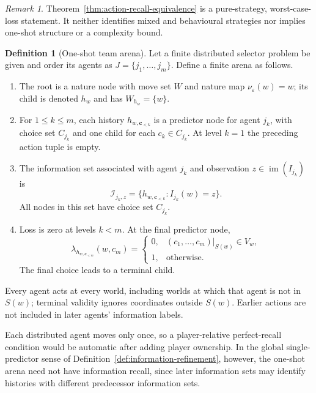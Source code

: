 \documentclass[11pt]{article}
\theoremstyle{plain}
\theoremstyle{definition}
\newtheorem{definition}[theorem]{Definition}
\theoremstyle{remark}
\newtheorem{remark}[theorem]{Remark}
\newcommand{\im}{\operatorname{im}}
\begin{document}
\begin{remark}
Theorem~\ref{thm:action-recall-equivalence} is a pure-strategy, worst-case-loss
statement. It neither identifies mixed and behavioural strategies nor implies
one-shot structure or a complexity bound.
\end{remark}



\begin{definition}[One-shot team arena]\label{def:oneshot}
Let a finite distributed selector problem be given and order its agents as
$J=\{j_1,\ldots,j_m\}$. Define a finite arena as follows.
\begin{enumerate}[label=(\roman*)]
\item The root is a nature node with move set $W$ and nature map
$\nu_\varepsilon(w)=w$; its child is denoted $h_w$ and has
$W_{h_w}=\{w\}$.
\item For $1\le k\le m$, each history
$h_{w,\mathbf c_{<k}}$ is a predictor node for agent $j_k$, with choice set
$C_{j_k}$ and one child for each $c_k\in C_{j_k}$. At level $k=1$ the preceding
action tuple is empty.
\item The information set associated with agent $j_k$ and observation
$z\in\im(I_{j_k})$ is
\[
\mathcal I_{j_k,z}
=\{h_{w,\mathbf c_{<k}}:I_{j_k}(w)=z\}.
\]
All nodes in this set have choice set $C_{j_k}$.
\item Loss is zero at levels $k<m$. At the final predictor node,
\[
\lambda_{h_{w,\mathbf c_{<m}}}(w,c_m)=
\begin{cases}
0,&(c_1,\ldots,c_m)|_{S(w)}\in V_w,\\
1,&\text{otherwise}.
\end{cases}
\]
The final choice leads to a terminal child.
\end{enumerate}
Every agent acts at every world, including worlds at which that agent is not in
$S(w)$; terminal validity ignores coordinates outside $S(w)$. Earlier actions
are not included in later agents' information labels.
\end{definition}

Each distributed agent moves only once, so a player-relative perfect-recall
condition would be automatic after adding player ownership. In the global
single-predictor sense of Definition~\ref{def:information-refinement}, however,
the one-shot arena need not have information recall, since later information
sets may identify histories with different predecessor information sets.
\end{document}
